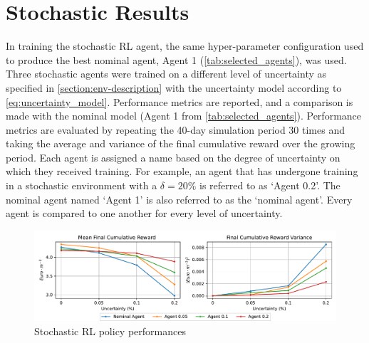 \section{Stochastic Results} \label{section:rl-stochastic-results}
In training the stochastic RL agent, the same hyper-parameter configuration used to produce the best nominal agent, Agent 1 (\autoref{tab:selected_agents}), was used. Three stochastic agents were trained on a different level of uncertainty as specified in \autoref{section:env-description} with the uncertainty model according to \autoref{eq:uncertainty_model}. Performance metrics are reported, and a comparison is made with the nominal model (Agent 1 from \autoref{tab:selected_agents}). Performance metrics are evaluated by repeating the 40-day simulation period 30 times and taking the average and variance of the final cumulative reward over the growing period. Each agent is assigned a name based on the degree of uncertainty on which they received training. For example, an agent that has undergone training in a stochastic environment with a $\delta = 20\%$ is referred to as ‘Agent 0.2’. The nominal agent named ‘Agent 1’ is also referred to as the ‘nominal agent’. Every agent is compared to one another for every level of uncertainty.

\begin{figure}[H]
    \centering
    \includegraphics[width = \textwidth]{figures/stochastic_rl_policies.pdf}
    \caption{Stochastic RL policy performances}
    \label{fig:stochastic-rl-policies}
\end{figure}

